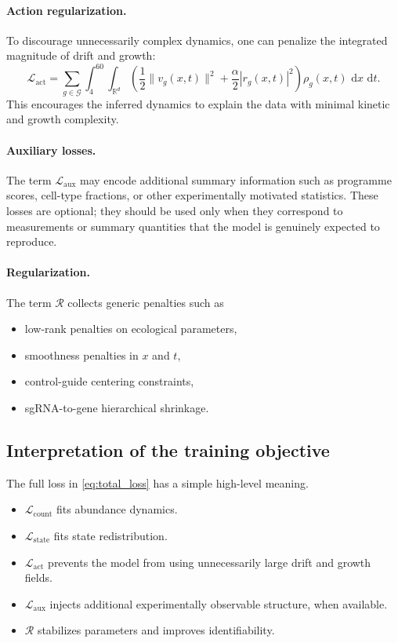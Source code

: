 \documentclass[11pt]{article}
\newcommand{\R}{\mathbb{R}}
\newcommand{\G}{\mathcal{G}}
\newcommand{\1}{\mathbf{1}}
\newcommand{\dd}{\,\mathrm{d}}
\theoremstyle{plain}
\begin{document}
\paragraph{Action regularization.}
To discourage unnecessarily complex dynamics, one can penalize the integrated magnitude of drift and growth:
\begin{equation}
\mathcal L_{\mathrm{act}}
=
\sum_{g\in\G}
\int_{4}^{60}\!\int_{\R^d}
\left(
\frac{1}{2}\|v_g(x,t)\|^2 + \frac{\alpha}{2}|r_g(x,t)|^2
\right)
\rho_g(x,t)\,\dd x\,\dd t.
\label{eq:action_loss}
\end{equation}
This encourages the inferred dynamics to explain the data with minimal kinetic and growth complexity.

\paragraph{Auxiliary losses.}
The term $\mathcal L_{\mathrm{aux}}$ may encode additional summary information such as programme scores, cell-type fractions, or other experimentally motivated statistics. These losses are optional; they should be used only when they correspond to measurements or summary quantities that the model is genuinely expected to reproduce.

\paragraph{Regularization.}
The term $\mathcal R$ collects generic penalties such as
\begin{itemize}
    \item low-rank penalties on ecological parameters,
    \item smoothness penalties in $x$ and $t$,
    \item control-guide centering constraints,
    \item sgRNA-to-gene hierarchical shrinkage.
\end{itemize}

\subsection{Interpretation of the training objective}

The full loss in \eqref{eq:total_loss} has a simple high-level meaning.
\begin{itemize}
    \item $\mathcal L_{\mathrm{count}}$ fits abundance dynamics.
    \item $\mathcal L_{\mathrm{state}}$ fits state redistribution.
    \item $\mathcal L_{\mathrm{act}}$ prevents the model from using unnecessarily large drift and growth fields.
    \item $\mathcal L_{\mathrm{aux}}$ injects additional experimentally observable structure, when available.
    \item $\mathcal R$ stabilizes parameters and improves identifiability.
\end{itemize}
\end{document}
